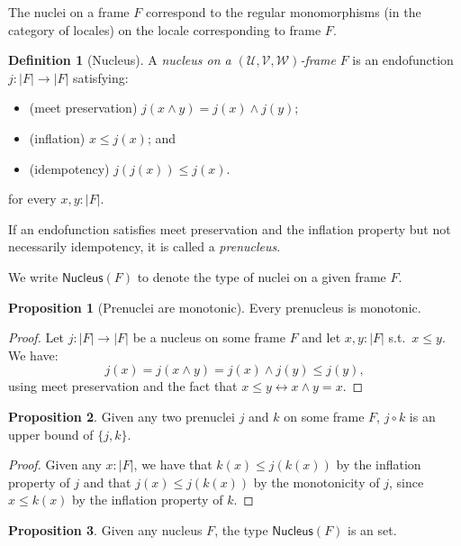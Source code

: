 \documentclass[a4paper, 11pt]{article}
\theoremstyle{definition}
\newtheorem{prop}{Proposition}
\newtheorem{defn}{Definition}
\newcommand{\UU}{\mathcal{U}}
\newcommand{\VV}{\mathcal{V}}
\newcommand{\WW}{\mathcal{W}}
\newcommand{\define}[1]{\emph{#1}}
\begin{document}
The nuclei on a frame $F$ correspond to the regular monomorphisms (in the category of locales) on
the locale corresponding to frame $F$.

\begin{defn}[Nucleus]
  A \define{nucleus on a $(\UU, \VV, \WW)$-frame} $F$ is an endofunction $j : | F | \rightarrow | F |$
  satisfying:
  \begin{itemize}
    \item (meet preservation) $j(x \wedge y) = j(x) \wedge j(y)$;
    \item (inflation) $x \le j(x)$; and
    \item (idempotency) $j(j(x)) \le j(x)$.
  \end{itemize}
  for every $x, y : | F |$.
\end{defn}

If an endofunction satisfies meet preservation and the inflation property but not necessarily
idempotency, it is called a \emph{prenucleus}.

We write $\mathsf{Nucleus}(F)$ to denote the type of nuclei on a given frame $F$.

\begin{prop}[Prenuclei are monotonic]\label{prop:nuclei-mono}
  Every prenucleus is monotonic.
\end{prop}
\begin{proof}
  Let $j : | F | \rightarrow | F |$ be a nucleus on some frame $F$ and let $x, y : | F |$
  s.t.\ $x \le y$.
  We have:
  \begin{equation*}
    j(x) = j (x \wedge y) = j(x) \wedge j(y) \le j(y),
  \end{equation*}
  using meet preservation and the fact that $x \le y \leftrightarrow x \wedge y = x$.
\end{proof}

\begin{prop}\label{prop:nucl-lemma-1}
  Given any two prenuclei $j$ and $k$ on some frame $F$, $j \circ k$ is an upper bound of $\{ j, k \}$.
\end{prop}
\begin{proof}
  Given any $x : | F |$, we have that $k(x) \le j(k(x))$ by the inflation property of $j$ and that
  $j(x) \le j(k(x))$ by the monotonicity of $j$, since $x \le k(x)$ by the inflation property of $k$.
\end{proof}

\begin{prop}
  Given any nucleus $F$, the type $\mathsf{Nucleus}(F)$ is an set.
\end{prop}
\end{document}
